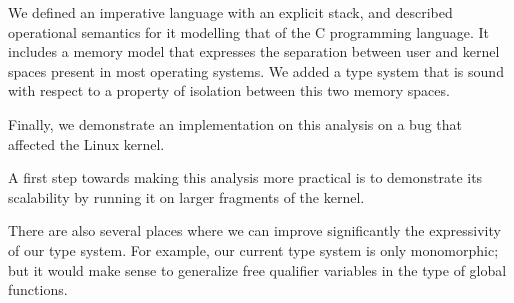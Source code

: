 We defined an imperative language with an explicit stack, and described
operational semantics for it modelling that of the C programming language. It
includes a memory model that expresses the separation between user and kernel
spaces present in most operating systems. We added a type system that is sound
with respect to a property of isolation between this two memory spaces.

Finally, we demonstrate an implementation on this analysis on a bug that
affected the Linux kernel.

A first step towards making this analysis more practical is to demonstrate its
scalability by running it on larger fragments of the kernel.

There are also several places where we can improve significantly the
expressivity of our type system. For example, our current type system is only
monomorphic; but it would make sense to generalize free qualifier variables in
the type of global functions.%










